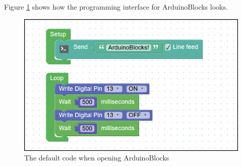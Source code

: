 Figure \ref{fig:arduinoBlocks} shows how the programming interface for ArduinoBlocks looks.

\begin{figure}[H]
	\centering
	\includegraphics[width=\textwidth/2+\textwidth/4]{2.Analysis/images/ArduinoBlocks.png}
	\caption{The default code when opening ArduinoBlocks}
	\label{fig:arduinoBlocks}
\end{figure}

